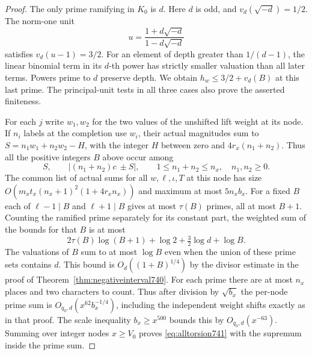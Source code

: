 \documentclass[a4paper,11pt]{article}
\theoremstyle{definition}
\theoremstyle{remark}
\numberwithin{equation}{section}
\begin{document}
\begin{proof}
The only prime ramifying in \(K_0\) is \(d\). Here \(d\) is odd,
and \(v_d(\sqrt{-d})=1/2\). The norm-one unit
\[
     u=\frac{1+d\sqrt{-d}}{1-d\sqrt{-d}}
\]
satisfies \(v_d(u-1)=3/2\). For an element of depth greater
than \(1/(d-1)\), the linear binomial term in its \(d\)-th
power has strictly smaller valuation than all later terms.
Powers prime to \(d\) preserve depth. We obtain
\(h_w\le 3/2+v_d(B)\) at this last prime. The principal-unit
tests in all three cases also prove the asserted finiteness.

For each \(j\) write \(w_1,w_2\) for the two values of the
unshifted lift weight at its node. If \(n_i\) labels at the
completion use \(w_i\), their actual magnitudes sum to
\(S=n_1w_1+n_2w_2-H\), with the integer \(H\) between zero
and \(4r_x(n_1+n_2)\). Thus all the positive integers \(B\)
above occur among
\[
  S,\qquad \bigl|(n_1+n_2)c\ \pm S\bigr|,
            \qquad 1\le n_1+n_2\le n_x,\quad n_1,n_2\ge0.
\]
The common list of actual sums for all \(w,\ell,\iota,T\) at
this node has size \(O(m_xt_x(n_x+1)^2(1+4r_xn_x))\) and
maximum at most \(5n_xb_x\).
For a fixed \(B\) each of \(\ell-1\mid B\) and \(\ell+1\mid B\)
gives at most \(\tau(B)\) primes, all at most \(B+1\).
Counting the ramified prime separately for its constant part,
the weighted sum of the bounds for that \(B\) is at most
\[
 2\tau(B)\log(B+1)+\log2+\tfrac32\log d+\log B .
\]
The valuations of \(B\) sum to at most \(\log B\) even when
the union of these prime sets contains \(d\). This bound is
\(O_d((1+B)^{1/4})\) by the divisor estimate in the proof of
Theorem~\ref{thm:negativeinterval740}. For each prime there
are at most \(n_x\) places and two characters to count. Thus
after division by \(\sqrt{b_x}\) the per-node prime sum is
\(O_{q_0,d}(x^{62}b_x^{-1/4})\), including the independent
weight shifts exactly as in that proof. The scale inequality
\(b_x\ge x^{500}\) bounds this by \(O_{q_0,d}(x^{-63})\).
Summing over integer nodes \(x\ge V_0\) proves
\eqref{eq:alltorsion741} with the supremum inside the prime sum.
\end{proof}
\end{document}
